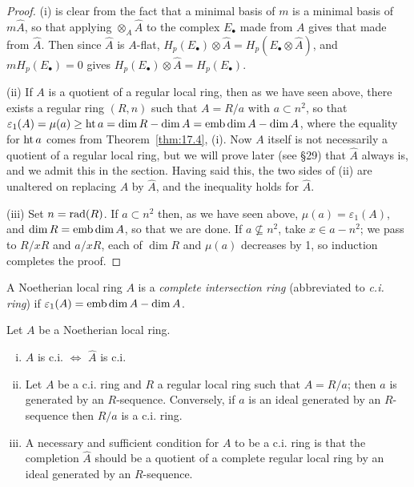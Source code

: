\begin{proof}
(i) is clear from the fact that a minimal basis of $m$ is a minimal
basis of $m\hat{A}$, so that applying $\otimes_A \hat{A}$ to the complex $E_\bullet$ made from $A$
gives that made from $\hat{A}$. Then since $\hat{A}$ is $A$-flat, $H_p(E_\bullet) \otimes \hat{A} = H_p(E_\bullet \otimes \hat{A})$,
and $mH_p(E_\bullet) = 0$ gives $H_p(E_\bullet) \otimes \hat{A} = H_p(E_\bullet)$.

(ii) If $A$ is a quotient of a regular local ring, then as we have seen above,
there exists a regular ring $(R, n)$ such that $A = R/a$ with $a \subset n^2$, so that
$\varepsilon_1(A) = \mu(a) \ge \operatorname{ht} a = \dim R - \dim A = \operatorname{emb\,dim} A - \dim A$, where the
equality for $\operatorname{ht} a$ comes from Theorem~\ref{thm:17.4}, (i). Now $A$ itself is not necessarily
a quotient of a regular local ring, but we will prove later (see \S29) that $\hat{A}$
always is, and we admit this in the section. Having said this, the two sides
of (ii) are unaltered on replacing $A$ by $\hat{A}$, and the inequality holds for $\hat{A}$.

(iii) Set $n = \operatorname{rad}(R)$. If $a \subset n^2$ then, as we have seen above, $\mu(a) = \varepsilon_1(A)$,
and $\dim R = \operatorname{emb\,dim} A$, so that we are done. If $a \nsubseteq n^2$, take $x \in a - n^2$;
we pass to $R/xR$ and $a/xR$, each of $\dim R$ and $\mu(a)$ decreases by 1, so
induction completes the proof.
\end{proof}

\begin{definition*}
A Noetherian local ring $A$ is a \emph{complete intersection ring}
(abbreviated to \emph{c.i. ring}) if $\varepsilon_1(A) = \operatorname{emb\,dim} A - \dim A$.
\end{definition*}

\begin{theorem}\label{thm:21.2}
Let $A$ be a Noetherian local ring.
\begin{enumerate}[(i)]
  \item $A$ is c.i. $\iff$ $\hat{A}$ is c.i.
  \item Let $A$ be a c.i. ring and $R$ a regular local ring such that $A = R/a$;
        then $a$ is generated by an $R$-sequence. Conversely, if $a$ is an ideal generated
        by an $R$-sequence then $R/a$ is a c.i. ring.
  \item A necessary and sufficient condition for $A$ to be a c.i. ring is that
        the completion $\hat{A}$ should be a quotient of a complete regular local ring
        by an ideal generated by an $R$-sequence.
\end{enumerate}
\end{theorem}

